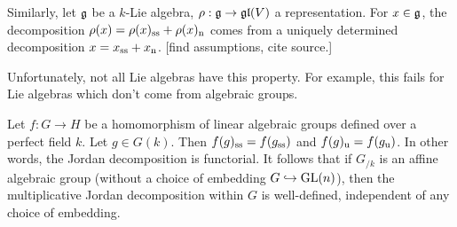 Similarly, let $\mathfrak{g}$ be a $k$-Lie algebra, $\rho:\mathfrak{g}\to \mathfrak{gl}(V)$ a 
representation. For $x\in \mathfrak{g}$, the decomposition 
$\rho(x)=\rho(x)_{\mathrm{ss}}+\rho(x)_{\mathrm{n}}$ comes from a uniquely 
determined decomposition $x=x_{\mathrm{ss}}+x_{\mathrm{n}}$. [find assumptions, 
cite source.]

Unfortunately, not all Lie algebras have this property. For example, this fails 
for Lie algebras which don't come from algebraic groups. 

Let $f:G\to H$ be a homomorphism of linear algebraic groups defined over a 
perfect field $k$. Let $g\in G(k)$. Then 
$f(g)_{\mathrm{ss}}=f(g_{\mathrm{ss}})$ and $f(g)_{\mathrm{u}}=f(g_{\mathrm{u}})$. 
In other words, the Jordan decomposition is functorial. 
It follows that if $G_{/k}$ is an affine algebraic group (without a choice of 
embedding $G\hookrightarrow \operatorname{GL}(n)$), then the multiplicative Jordan 
decomposition within $G$ is well-defined, independent of any choice of 
embedding. 




